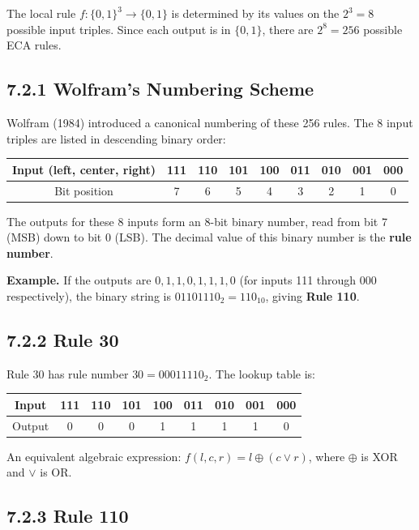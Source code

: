 The local rule $f: \{ 0,1\} ^3 \to \{ 0,1\} $ is determined by its values on the $2^3 = 8$ possible input triples. Since each output is in $\{ 0,1\} $, there are $2^8 = 256$ possible ECA rules.

\subsection{7.2.1 Wolfram's Numbering Scheme}

Wolfram (1984) introduced a canonical numbering of these 256 rules. The 8 input triples are listed in descending binary order:

\begin{center}
\begin{tabular}{ccccccccc}
\toprule
Input (left, center, right) & 111 & 110 & 101 & 100 & 011 & 010 & 001 & 000 \\
\midrule
Bit position & 7 & 6 & 5 & 4 & 3 & 2 & 1 & 0 \\
\bottomrule
\end{tabular}
\end{center}

The outputs for these 8 inputs form an 8-bit binary number, read from bit 7 (MSB) down to bit 0 (LSB). The decimal value of this binary number is the \textbf{rule number}.

\textbf{Example.} If the outputs are $0, 1, 1, 0, 1, 1, 1, 0$ (for inputs 111 through 000 respectively), the binary string is $01101110_2 = 110_{10}$, giving \textbf{Rule 110}.


\subsection{7.2.2 Rule 30}

Rule 30 has rule number $30 = 00011110_2$. The lookup table is:

\begin{center}
\begin{tabular}{ccccccccc}
\toprule
Input & 111 & 110 & 101 & 100 & 011 & 010 & 001 & 000 \\
\midrule
Output & 0 & 0 & 0 & 1 & 1 & 1 & 1 & 0 \\
\bottomrule
\end{tabular}
\end{center}

An equivalent algebraic expression: $f(l, c, r) = l \oplus (c \lor r)$, where $\oplus$ is XOR and $\lor$ is OR.

\subsection{7.2.3 Rule 110}

